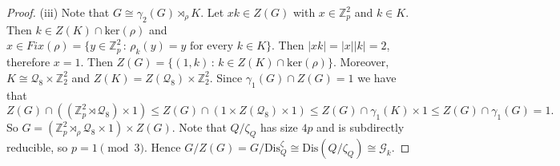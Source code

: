 \documentclass[a4paper, english, 9pt]{amsart}
\theoremstyle{plain}
\newtheorem{theorem}{Theorem}[section]
\theoremstyle{definition}
\def\ker#1{\mathrm{ker}(#1)}
\def\dis{\mathrm{Dis}}
\def\setof#1#2{\{#1\,\colon\,#2\}}
\def\Z{\mathbb Z}
\begin{document}
\begin{proof}

(iii) Note that $G\cong \gamma_2(G)\rtimes_\rho K$. Let $xk\in Z(G)$ with $x\in \Z_p^2$ and $k\in K$. Then $k\in Z(K)\cap \ker{\rho}$ and $x\in Fix(\rho)=\setof{y\in \Z_p^2}{\rho_k(y)=y \text{ for every }k\in K}$. Then $|xk|=|x||k|=2$, therefore $x=1$. Then $Z(G)=\setof{(1,k)}{k\in Z(K)\cap \ker{\rho}}$. Moreover, $K\cong \mathcal{Q}_8\times \Z_2^2$ and $Z(K)=Z(\mathcal{Q}_8)\times \Z_2^2$. Since $\gamma_1(G)\cap Z(G)=1$ we have that $$Z(G)\cap ((\Z_p^2\rtimes \mathcal{Q}_8)\times 1) \leq Z(G)\cap \left(1\times Z(\mathcal{Q}_8)\times 1\right)\leq Z(G)\cap \gamma_1(K)\times 1\leq Z(G)\cap \gamma_1(G)=1.$$ So $G=\left(\Z_p^2\rtimes_\rho \mathcal{Q}_8\times 1\right)\times Z(G)$. Note that $Q/\zeta_Q$ has size $4p$ and is subdirectly reducible, so $p=1\pmod{3}$. Hence $G/Z(G)=G/\dis^\zeta_Q\cong \dis(Q/\zeta_Q)\cong \mathcal{G}_k$.
\end{proof}


\end{document}
